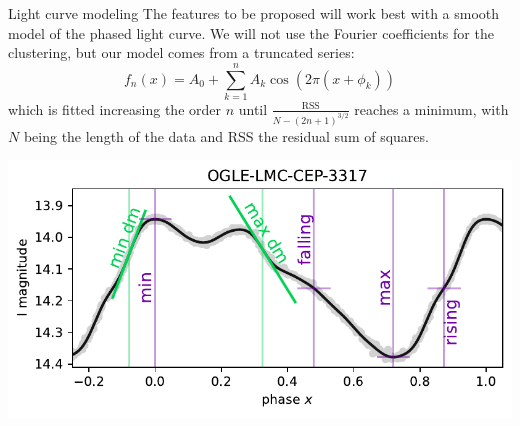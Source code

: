 \documentclass[
    a0paper,
    portrait,
]{baposter}
\begin{document}
\begin{poster}
\begin{posterbox}[column=0,below=data,height=bottom]{Light curve modeling}
    \setlength{\belowdisplayskip}{0pt} \setlength{\belowdisplayshortskip}{0pt}
    \setlength{\abovedisplayskip}{0pt} \setlength{\abovedisplayshortskip}{0pt}
    The features to be proposed will work best with a smooth model of the phased light curve. 
    We will not use the Fourier coefficients for the clustering, but our model comes from a truncated series:
    $$
    f_n(x) = A_0 + \sum_{k=1}^n A_k \cos(2\pi(x+\phi_k))
    $$
    which is fitted increasing the order $n$ until $\frac{\text{RSS}}{N-(2n+1)^{3/2}}$ reaches a minimum, with $N$ being the length of the data and RSS the residual sum of squares.
    \vspace{-3.1mm}
    \begin{center}
        \includegraphics[width=\textwidth]{fig/features.pdf}
        \vspace{-6.8mm}
        \label{fig:features}
    \end{center}
\end{posterbox}




\end{poster}
\end{document}
